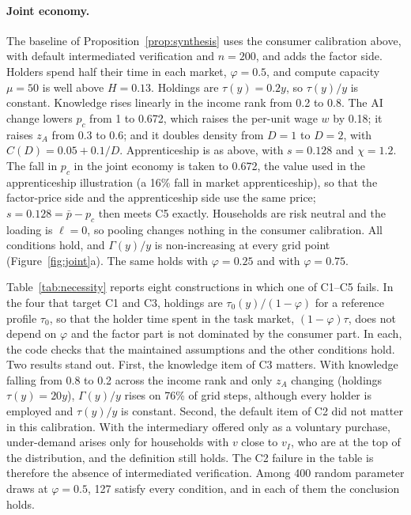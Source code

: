 \documentclass[12pt]{article}
\theoremstyle{remark}
\begin{document}
\paragraph{Joint economy.} The baseline of Proposition~\ref{prop:synthesis} uses the consumer calibration above, with default intermediated verification and $n=200$, and adds the factor side. Holders spend half their time in each market, $\varphi=0.5$, and compute capacity $\mu=50$ is well above $H=0.13$. Holdings are $\tau(y)=0.2y$, so $\tau(y)/y$ is constant. Knowledge rises linearly in the income rank from 0.2 to 0.8. The AI change lowers $p_c$ from 1 to 0.672, which raises the per-unit wage $w$ by 0.18; it raises $z_A$ from 0.3 to 0.6; and it doubles density from $D=1$ to $D=2$, with $C(D)=0.05+0.1/D$. Apprenticeship is as above, with $s=0.128$ and $\chi=1.2$. The fall in $p_c$ in the joint economy is taken to 0.672, the value used in the apprenticeship illustration (a 16\% fall in market apprenticeship), so that the factor-price side and the apprenticeship side use the same price; $s=0.128=\bar p-p_c$ then meets C5 exactly. Households are risk neutral and the loading is $\ell=0$, so pooling changes nothing in the consumer calibration. All conditions hold, and $\Gamma(y)/y$ is non-increasing at every grid point (Figure~\ref{fig:joint}a). The same holds with $\varphi=0.25$ and with $\varphi=0.75$.

Table~\ref{tab:necessity} reports eight constructions in which one of C1--C5 fails. In the four that target C1 and C3, holdings are $\tau_0(y)/(1-\varphi)$ for a reference profile $\tau_0$, so that the holder time spent in the task market, $(1-\varphi)\tau$, does not depend on $\varphi$ and the factor part is not dominated by the consumer part. In each, the code checks that the maintained assumptions and the other conditions hold. Two results stand out. First, the knowledge item of C3 matters. With knowledge falling from 0.8 to 0.2 across the income rank and only $z_A$ changing (holdings $\tau(y)=20y$), $\Gamma(y)/y$ rises on 76\% of grid steps, although every holder is employed and $\tau(y)/y$ is constant. Second, the default item of C2 did not matter in this calibration. With the intermediary offered only as a voluntary purchase, under-demand arises only for households with $v$ close to $v_I$, who are at the top of the distribution, and the definition still holds. The C2 failure in the table is therefore the absence of intermediated verification. Among 400 random parameter draws at $\varphi=0.5$, 127 satisfy every condition, and in each of them the conclusion holds.
\end{document}
